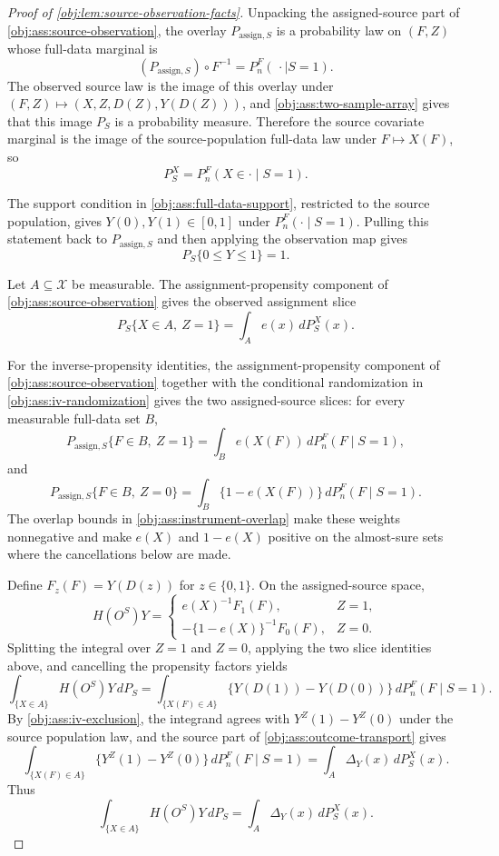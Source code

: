 \begin{proof}[Proof of \cref{obj:lem:source-observation-facts}]
Unpacking the assigned-source part of \cref{obj:ass:source-observation}, the overlay
\(P_{\mathrm{assign},S}\) is a probability law on \((F,Z)\) whose full-data marginal is
\[
(P_{\mathrm{assign},S})\circ F^{-1}
=
P_n^F(\,\cdot\mid S=1).
\]
The observed source law is the image of this overlay under
\((F,Z)\mapsto (X,Z,D(Z),Y(D(Z)))\), and \cref{obj:ass:two-sample-array} gives that this image
\(P_S\) is a probability measure.  Therefore the source covariate marginal is the image of the
source-population full-data law under \(F\mapsto X(F)\), so
\[
P_S^X=P_n^F(X\in\cdot\mid S=1).
\]

The support condition in \cref{obj:ass:full-data-support}, restricted to the source population,
gives \(Y(0),Y(1)\in[0,1]\) under \(P_n^F(\cdot\mid S=1)\).  Pulling this statement back to
\(P_{\mathrm{assign},S}\) and then applying the observation map gives
\[
P_S\{0\le Y\le1\}=1.
\]

Let \(A\subseteq\mathcal X\) be measurable.  The assignment-propensity component of
\cref{obj:ass:source-observation} gives the observed assignment slice
\[
P_S\{X\in A,\ Z=1\}
=
\int_A e(x)\,dP_S^X(x).
\]

For the inverse-propensity identities, the assignment-propensity component of
\cref{obj:ass:source-observation} together with the conditional randomization in
\cref{obj:ass:iv-randomization} gives the two assigned-source slices: for every measurable
full-data set \(B\),
\[
P_{\mathrm{assign},S}\{F\in B,\ Z=1\}
=
\int_B e(X(F))\,dP_n^F(F\mid S=1),
\]
and
\[
P_{\mathrm{assign},S}\{F\in B,\ Z=0\}
=
\int_B \{1-e(X(F))\}\,dP_n^F(F\mid S=1).
\]
The overlap bounds in \cref{obj:ass:instrument-overlap} make these weights nonnegative and make
\(e(X)\) and \(1-e(X)\) positive on the almost-sure sets where the cancellations below are made.

Define \(F_z(F)=Y(D(z))\) for \(z\in\{0,1\}\).  On the assigned-source space,
\[
H(O^S)Y
=
\begin{cases}
e(X)^{-1}F_1(F), & Z=1,\\
-\{1-e(X)\}^{-1}F_0(F), & Z=0.
\end{cases}
\]
Splitting the integral over \(Z=1\) and \(Z=0\), applying the two slice identities above, and
cancelling the propensity factors yields
\[
\int_{\{X\in A\}} H(O^S)Y\,dP_S
=
\int_{\{X(F)\in A\}}\{Y(D(1))-Y(D(0))\}\,dP_n^F(F\mid S=1).
\]
By \cref{obj:ass:iv-exclusion}, the integrand agrees with \(Y^Z(1)-Y^Z(0)\) under the source
population law, and the source part of \cref{obj:ass:outcome-transport} gives
\[
\int_{\{X(F)\in A\}}\{Y^Z(1)-Y^Z(0)\}\,dP_n^F(F\mid S=1)
=
\int_A\Delta_Y(x)\,dP_S^X(x).
\]
Thus
\[
\int_{\{X\in A\}} H(O^S)Y\,dP_S
=
\int_A\Delta_Y(x)\,dP_S^X(x).
\]


\end{proof}
